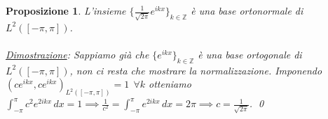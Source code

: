 \documentclass[a4paper,12pt]{report}
\newtheorem{proposizione}{Proposizione}[chapter]
\begin{document}
\vspace{1cm}
\begin{proposizione}\label{app: .3}
    L'insieme $\bigg\{\displaystyle\frac{1}{\sqrt{2\pi}}e^{ikx}\bigg\}_{k\in \mathbb{Z}}$ è una base ortonormale di $L^2([-\pi,\pi])$.
    \\
    \\ \underline{Dimostrazione}: Sappiamo già che $\{e^{ikx}\}_{k\in \mathbb{Z}}$ è una base ortogonale di $L^2([-\pi,\pi])$, non ci resta che mostrare la normalizzazione. Imponendo $(ce^{ikx},ce^{ikx})_{L^2([-\pi,\pi])}=1 \ \ \forall k$ otteniamo $\displaystyle\int_{-\pi}^\pi c^2e^{2ikx}\,dx=1\implies\frac{1}{c^2}=\int_{-\pi}^\pi e^{2ikx}\,dx=2\pi\implies c=\frac{1}{\sqrt{2\pi}}$. \qed
\end{proposizione}

\newpage
\end{document}

